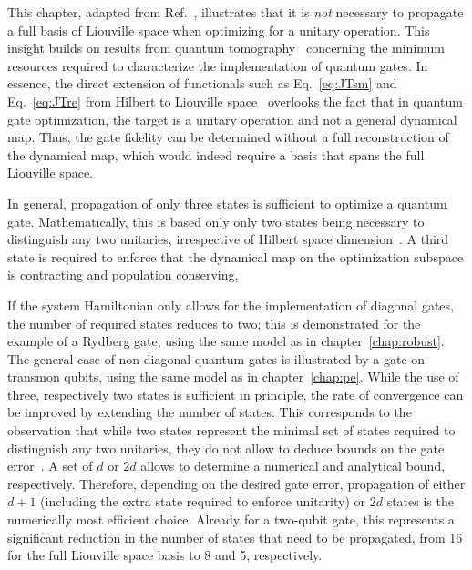 This chapter, adapted from Ref.~\cite{Goerz3States}, illustrates that it is
\emph{not} necessary to propagate a full basis of Liouville space when
optimizing for a unitary operation. This insight builds on results from quantum
tomography~\cite{ReichKochPRA13, ReichKochPRL13} concerning the minimum
resources required to characterize the implementation of quantum gates. 
In essence, the direct extension of functionals such as Eq.~\eqref{eq:JTsm} and
Eq.~\eqref{eq:JTre} from Hilbert to
Liouville space~\cite{KallushPRA06,OhtsukiNJP10,ToSHJPB11}
overlooks the fact that in quantum gate optimization,
the target is a unitary operation and not a general dynamical map.
Thus, the gate fidelity can be determined without a full reconstruction of the
dynamical map, which would indeed require a basis that spans the full Liouville
space.

In general, propagation of only three states is sufficient to optimize a quantum
gate. Mathematically, this is based only only two states being necessary to
distinguish any two unitaries, irrespective of Hilbert space
dimension~\cite{ReichKochPRA13}.
A third state is required to enforce that the dynamical map on the optimization
subspace is contracting and population conserving,

\enlargethispage{\baselineskip}
If the system Hamiltonian only allows for the implementation of diagonal
gates, the number of required states reduces to two; this is demonstrated for
the example of a Rydberg gate, using the same model as in
chapter~\ref{chap:robust}. The general case of non-diagonal quantum gates is
illustrated by a \sqrtISWAP{} gate on transmon qubits, using the same model as
in chapter~\ref{chap:pe}.  While the use of three, respectively two states is
sufficient in principle, the rate of convergence can be improved by extending
the number of states. This corresponds to the observation that while
two states represent the minimal set of states required to
distinguish any two unitaries, they do not allow to deduce bounds on the gate
error~\cite{ReichKochPRA13}. A set of $d$ or $2d$ allows to determine
a numerical and analytical bound, respectively.
Therefore, depending on the desired gate error, propagation of either $d+1$
(including the extra state required to enforce unitarity) or
$2d$ states is the numerically most efficient choice. Already for a two-qubit
gate, this represents a significant reduction in the number of
states that need to be propagated, from 16 for the full Liouville space basis to
8 and 5, respectively.


